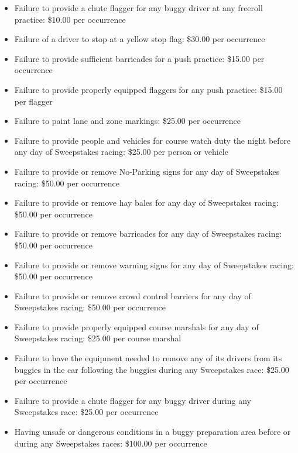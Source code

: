 \begin{itemize}
		\item Failure to provide a chute flagger for any buggy driver at any
		freeroll practice: \$10.00 per occurrence

		\item Failure of a driver to stop at a yellow stop flag: \$30.00 per
		occurrence

		\item Failure to provide sufficient barricades for a push practice: \$15.00
		per occurrence

		\item Failure to provide properly equipped flaggers for any push practice:
		\$15.00 per flagger

		\item Failure to paint lane and zone markings: \$25.00 per occurrence

		\item Failure to provide people and vehicles for course watch duty the
		night before any day of Sweepstakes racing: \$25.00 per person or vehicle

		\item Failure to provide or remove No-Parking signs for any day of
		Sweepstakes racing: \$50.00 per occurrence

		\item Failure to provide or remove hay bales for any day of Sweepstakes
		racing: \$50.00 per occurrence

		\item Failure to provide or remove barricades for any day of Sweepstakes
		racing: \$50.00 per occurrence

		\item Failure to provide or remove warning signs for any day of Sweepstakes
		racing: \$50.00 per occurrence

		\item Failure to provide or remove crowd control barriers for any day of
		Sweepstakes racing: \$50.00 per occurrence

		\item Failure to provide properly equipped course marshals for any day of
		Sweepstakes racing: \$25.00 per course marshal

		\item Failure to have the equipment needed to remove any of its drivers
		from its buggies in the car following the buggies during any Sweepstakes race:
		\$25.00 per occurrence

		\item Failure to provide a chute flagger for any buggy driver during any
		Sweepstakes race: \$25.00 per occurrence

		\item Having unsafe or dangerous conditions in a buggy preparation area
		before or during any Sweepstakes races: \$100.00 per occurrence

	\end{itemize}

